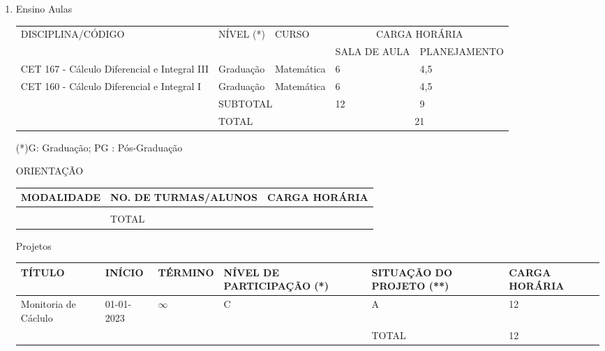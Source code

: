 \documentclass[a4paper]{article}
\begin{document}
	\begin{enumerate}

		\item Ensino
		\subitem Aulas

			\begin{tabular}{|p{4cm}|p{2cm}|p{4cm}|p{1.8cm}|p{2cm}|}
				\hline
				\multirow{2}{*}{DISCIPLINA/CÓDIGO}			&\multirow{2}{*}{NÍVEL (*)}  &\multirow{2}{*}{CURSO } & 		\multicolumn{2}{c|}{CARGA HORÁRIA}			\\ \cline{4-5} 
															& 							 & 						  &	{\tiny SALA DE AULA}		&  {\tiny PLANEJAMENTO}	\\ \hline\hline
				CET 167 - Cálculo Diferencial e Integral III& Graduação					 & 	Matemática			  &	\hfil	6					& \hfil 	4,5			\\ \hline
				CET 160 - Cálculo Diferencial e Integral I	& Graduação					 & 	Matemática			  &	\hfil	6					& \hfil 	4,5			\\ \hline
				\multicolumn{1}{c|}{}	 					&\multicolumn{2}{l|}{SUBTOTAL} 						  &	\hfil	12					& \hfil		9			\\ \cline{2-5}
				\multicolumn{1}{c|}{}	 					&\multicolumn{2}{l|}{TOTAL} 						  &	\multicolumn{2}{c|}{21}  							\\ \cline{2-5}
			\end{tabular}

			(*)G:  Graduação; PG :  Pós-Graduação

		\subitem ORIENTAÇÃO

			\begin{tabular}{|p{5.7cm}|p{5cm}|p{4cm}|}
				\hline
				MODALIDADE				&  NO. DE TURMAS/ALUNOS	&CARGA HORÁRIA  \\ \hline \hline
										&  					    & 				\\	\hline
				\multicolumn{1}{c|}{}	& TOTAL 				&  				\\ \cline{2-3}
			\end{tabular}

		\subitem Projetos

			\begin{tabular}{|p{2.8cm}|p{1.4cm}|p{1.4cm}|p{3cm}|p{2.8cm}|p{2.0cm}|}
				\hline
				TÍTULO						    &  INÍCIO    	&TÉRMINO	&	NÍVEL DE PARTICIPAÇÃO (*) 	&  SITUAÇÃO DO PROJETO (**) & CARGA  HORÁRIA 		\\ \hline\hline
				Monitoria de Cáclulo			& 01-01-2023	&$\infty$	&			C					&			A	     		&\hfil 	12				\\ \hline
				\multicolumn{4}{c|}{}																		& TOTAL   					&\hfil		12			\\ \cline{5-6}
			\end{tabular}


\end{enumerate}
\end{document}

